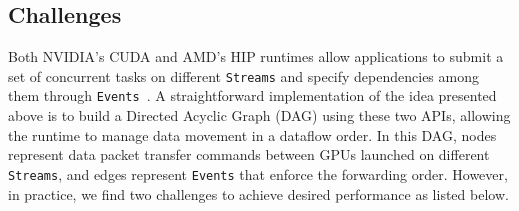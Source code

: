 
\subsection{\textbf{Challenges}} \label{sec:io-challenges}
Both NVIDIA's CUDA and AMD's HIP runtimes allow applications to submit a set of concurrent tasks on different \texttt{Streams} and specify dependencies among them through \texttt{Events}~\cite{cuda, hip}.
A straightforward implementation of the idea presented above is to build a Directed Acyclic Graph (DAG) using these two APIs, allowing the runtime to manage data movement in a dataflow order.
In this DAG, nodes represent data packet transfer commands between GPUs launched on different \texttt{Streams}, and edges represent \texttt{Events} that enforce the forwarding order.
However, in practice, we find two challenges to achieve desired performance as listed below.

\begin{comment}
Both Nvidia's cuda and AMD's HIP runtime allow applications to submit a set of concurrent tasks on different \texttt{Streams} and specify the dependency among them through \texttt{Events}~\cite{cuda, hip}.
One straightforward implementation for the idea in \S\ref{sec:io-high-level} is to represent it as a Directed Acyclic Graph (DAG) using these two APIs and let the runtime take the responsibility to carry out the data movement in a dataflow order.
The nodes are the data packet transfer commands between GPUs launched on different \texttt{Streams}, and the edges are the \texttt{Events} that enforce the forwarding order.
However, we struggle to achieve high IO throughput following this baseline strategy due to two pitfalls.
\end{comment}

